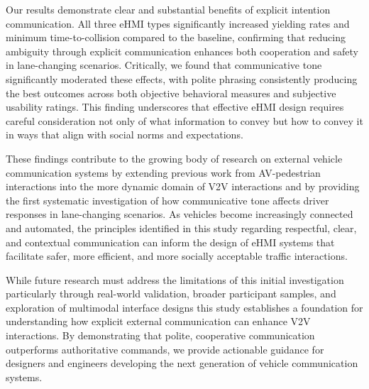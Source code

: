 \documentclass[manuscript,review]{acmart}
\begin{document}
Our results demonstrate clear and substantial benefits of explicit intention communication. All three eHMI types significantly increased yielding rates and minimum time-to-collision compared to the baseline, confirming that reducing ambiguity through explicit communication enhances both cooperation and safety in lane-changing scenarios. Critically, we found that communicative tone significantly moderated these effects, with polite phrasing consistently producing the best outcomes across both objective behavioral measures and subjective usability ratings. This finding underscores that effective eHMI design requires careful consideration not only of what information to convey but how to convey it in ways that align with social norms and expectations.

These findings contribute to the growing body of research on external vehicle communication systems by extending previous work from AV-pedestrian interactions into the more dynamic domain of V2V interactions and by providing the first systematic investigation of how communicative tone affects driver responses in lane-changing scenarios. As vehicles become increasingly connected and automated, the principles identified in this study regarding respectful, clear, and contextual communication can inform the design of eHMI systems that facilitate safer, more efficient, and more socially acceptable traffic interactions.

While future research must address the limitations of this initial investigation particularly through real-world validation, broader participant samples, and exploration of multimodal interface designs this study establishes a foundation for understanding how explicit external communication can enhance V2V interactions. By demonstrating that polite, cooperative communication outperforms authoritative commands, we provide actionable guidance for designers and engineers developing the next generation of vehicle communication systems.



\end{document}
